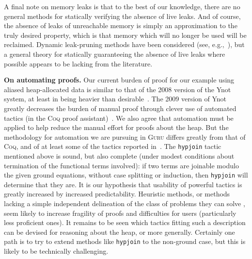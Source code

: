 \documentclass[9pt,natbib]{sigplanconf}
\begin{document}
A final note on memory leaks is that to the best of our knowledge,
there are no general methods for statically verifying the absence of
live leaks.  And of course, the absence of leaks of unreachable memory
is simply an approximation to the truly desired property, which is
that memory which will no longer be used will be reclaimed.  Dynamic
leak-pruning methods have been considered (see, e.g.,~\cite{bond+09}),
but a general theory for statically guaranteeing the absence of live
leaks where possible appears to be lacking from the literature.

\textbf{On automating proofs.} Our current burden of proof for our
example using aliased heap-allocated data is similar to that of the
2008 version of the Ynot system, at least in being heavier than
desirable~\cite{nanevski+08}.  The 2009 version of Ynot greatly
decreases the burden of manual proof through clever use of automated
tactics (in the \textsc{Coq} proof assistant)~\cite{ynot09}.  We also
agree that automation must be applied to help reduce the manual effort
for proofs about the heap.  But the methodology for automation we are
pursuing in \textsc{Guru} differs greatly from that of \textsc{Coq},
and of at least some of the tactics reported in~\cite{ynot09}.  The
\texttt{hypjoin} tactic mentioned above is sound, but also complete
(under modest conditions about termination of the functional terms
involved): if two terms are joinable modulo the given ground
equations, without case splitting or induction, then \texttt{hypjoin}
will determine that they are.  It is our hypothesis that usability of
powerful tactics is greatly increased by increased predictability.
Heuristic methods, or methods lacking a simple independent delineation
of the class of problems they can solve , seem likely to increase
fragility of proofs and difficulties for users (particularly less
proficient ones).  It remains to be seen which tactics fitting such a
description can be devised for reasoning about the heap, or more
generally.  Certainly one path is to try to extend methods like
\texttt{hypjoin} to the non-ground case, but this is likely to be
technically challenging.
\end{document}
